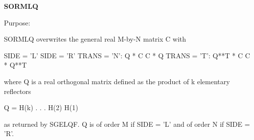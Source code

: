 {\bfseries S\+O\+R\+M\+L\+Q} 

 \begin{DoxyParagraph}{Purpose\+: }
\begin{DoxyVerb} SORMLQ overwrites the general real M-by-N matrix C with

                 SIDE = 'L'     SIDE = 'R'
 TRANS = 'N':      Q * C          C * Q
 TRANS = 'T':      Q**T * C       C * Q**T

 where Q is a real orthogonal matrix defined as the product of k
 elementary reflectors

       Q = H(k) . . . H(2) H(1)

 as returned by SGELQF. Q is of order M if SIDE = 'L' and of order N
 if SIDE = 'R'.\end{DoxyVerb}
 
\end{DoxyParagraph}

